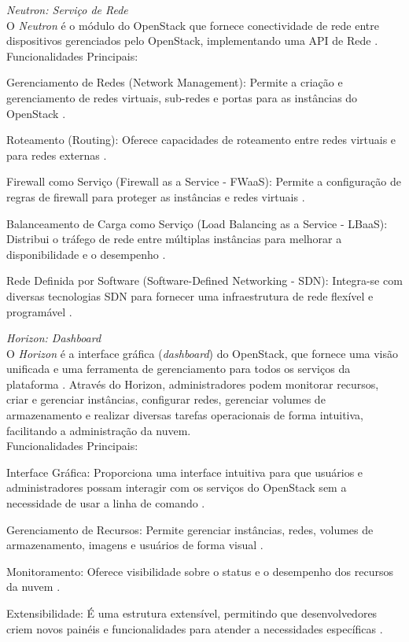 \begin{description}
    \item \emph{Neutron: Serviço de Rede}\\
    O \textit{Neutron} é o módulo do OpenStack que fornece conectividade de rede entre dispositivos gerenciados pelo OpenStack, implementando uma API de Rede \cite{openstackneutron}.\\
    Funcionalidades Principais:
    \begin{description}
        \item Gerenciamento de Redes (Network Management): Permite a criação e gerenciamento de redes virtuais, sub-redes e portas para as instâncias do OpenStack \cite{openstackneutron}.
        \item Roteamento (Routing): Oferece capacidades de roteamento entre redes virtuais e para redes externas \cite{openstackneutron}.
        \item Firewall como Serviço (Firewall as a Service - FWaaS): Permite a configuração de regras de firewall para proteger as instâncias e redes virtuais \cite{openstackneutron}.
        \item Balanceamento de Carga como Serviço (Load Balancing as a Service - LBaaS): Distribui o tráfego de rede entre múltiplas instâncias para melhorar a disponibilidade e o desempenho \cite{openstackneutron}.
        \item Rede Definida por Software (Software-Defined Networking - SDN): Integra-se com diversas tecnologias SDN para fornecer uma infraestrutura de rede flexível e programável \cite{openstackneutron}.
    \end{description}

    \item \emph{Horizon: Dashboard}\\
    O \textit{Horizon} é a interface gráfica (\textit{dashboard}) do OpenStack, que fornece uma visão unificada e uma ferramenta de gerenciamento para todos os serviços da plataforma \cite{openstackhorizon}. Através do Horizon, administradores podem monitorar recursos, criar e gerenciar instâncias, configurar redes, gerenciar volumes de armazenamento e realizar diversas tarefas operacionais de forma intuitiva, facilitando a administração da nuvem.\\
    Funcionalidades Principais:
    \begin{description}
        \item Interface Gráfica: Proporciona uma interface intuitiva para que usuários e administradores possam interagir com os serviços do OpenStack sem a necessidade de usar a linha de comando \cite{openstackhorizon}.
        \item Gerenciamento de Recursos: Permite gerenciar instâncias, redes, volumes de armazenamento, imagens e usuários de forma visual \cite{openstackhorizon}.
        \item Monitoramento: Oferece visibilidade sobre o status e o desempenho dos recursos da nuvem \cite{openstackhorizon}.
        \item Extensibilidade: É uma estrutura extensível, permitindo que desenvolvedores criem novos painéis e funcionalidades para atender a necessidades específicas \cite{openstackhorizon}.
    \end{description}


\end{description}
